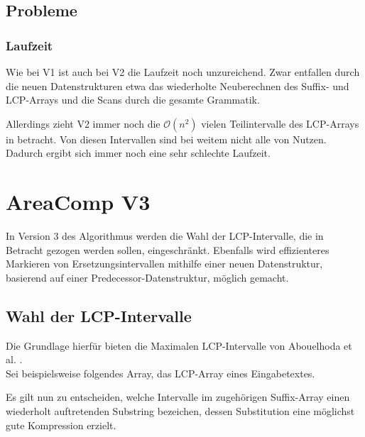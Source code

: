 \subsection{Probleme}

\subsubsection{Laufzeit}

Wie bei V1 ist auch bei V2 die Laufzeit noch unzureichend. Zwar entfallen durch die neuen Datenstrukturen etwa das wiederholte Neuberechnen des Suffix- und LCP-Arrays und die Scans durch die gesamte Grammatik.

Allerdings zieht V2 immer noch die $\mathcal{O}(n^2)$ vielen Teilintervalle des LCP-Arrays in betracht. Von diesen Intervallen sind bei weitem nicht alle von Nutzen. Dadurch ergibt sich immer noch eine sehr schlechte Laufzeit.

\section{AreaComp V3}

In Version 3 des Algorithmus werden die Wahl der LCP-Intervalle, die in Betracht gezogen werden sollen, eingeschränkt. Ebenfalls wird effizienteres Markieren von Ersetzungsintervallen mithilfe einer neuen Datenstruktur, basierend auf einer Predecessor-Datenstruktur, möglich gemacht. 

\subsection{Wahl der LCP-Intervalle}

Die Grundlage hierfür bieten die Maximalen LCP-Intervalle von Abouelhoda et al. \cite{abouelhoda_optimal_2002}.\\
Sei beispielsweise folgendes Array, das LCP-Array eines Eingabetextes. 
\begin{figure}[H]
	\centering
\end{figure}
Es gilt nun zu entscheiden, welche Intervalle im zugehörigen Suffix-Array einen wiederholt auftretenden Substring bezeichen, dessen Substitution eine möglichst gute Kompression erzielt.

